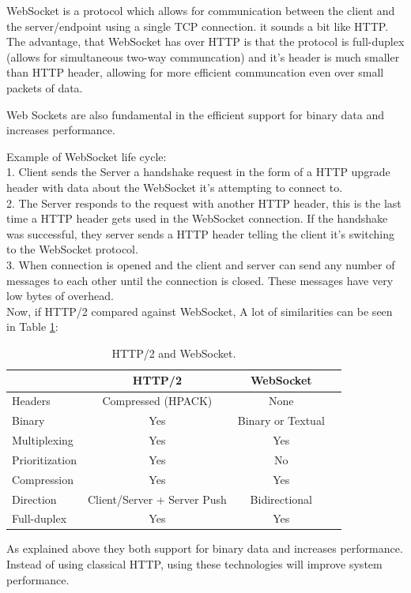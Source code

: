 WebSocket is a protocol which allows for communication between the client and the server/endpoint using a single TCP connection. it sounds a bit like HTTP. The advantage, that WebSocket has over HTTP is that the protocol is full-duplex (allows for simultaneous two-way communcation) and it’s header is much smaller than HTTP header, allowing for more efficient communcation even over small packets of data.

Web Sockets are also fundamental in the efficient support for binary data and increases performance.

Example of WebSocket life cycle:\citep{thesis:state7}\\
1. Client sends the Server a handshake request in the form of a HTTP upgrade header with data about the WebSocket
it’s attempting to connect to.\\
2. The Server responds to the request with another HTTP header, this is the last time a HTTP header gets used in the WebSocket connection. If the handshake was successful, they server sends a HTTP header telling the client it’s switching to the WebSocket protocol.\\
3. When connection is opened and the client and server can send any number of messages to each other
until the connection is closed. These messages have very low bytes of overhead.\\

Now, if HTTP/2 compared against WebSocket\citep{thesis:state11}, A lot of similarities can be seen in Table \ref{tab:websocket}:
\begin{table}[!htb]
  \renewcommand{\arraystretch}{1.2} %
  \centering
  \begin{tabular}{lccc}
    \toprule
                   & HTTP/2                      & WebSocket  \\
    \midrule
    Headers        & Compressed (HPACK)          & None\\
    Binary         & Yes                         & Binary or Textual\\
    Multiplexing   & Yes                         & Yes\\
    Prioritization & Yes                         & No\\
    Compression    & Yes                         & Yes\\
    Direction      & Client/Server + Server Push & Bidirectional\\
    Full-duplex    & Yes                         & Yes\\

    \bottomrule
  \end{tabular}
  \caption[HTTP/2 and WebSocket.]{HTTP/2 and WebSocket.}
  \label{tab:websocket}
\end{table}

As explained above they both support for binary data and increases performance. Instead of using classical HTTP, using these technologies will improve system performance.
